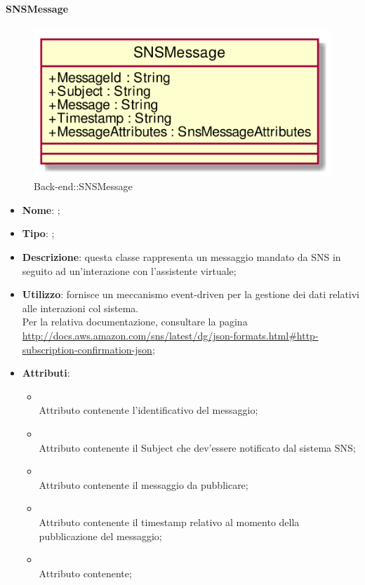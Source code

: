 \hypertarget{SNSMessage_label}{\paragraph{SNSMessage}}
\begin{figure}[h]
	\centering
	\includegraphics[width=\textwidth,height=\textheight,keepaspectratio]{images/ClassSNSMessage.png}
	\caption{Back-end::SNSMessage}
\end{figure}
\begin{itemize}
	\item \textbf{Nome}: ;
	\item \textbf{Tipo}: ;
	\item \textbf{Descrizione}: questa classe rappresenta un messaggio mandato da SNS in seguito ad un'interazione con l'assistente virtuale;
	\item \textbf{Utilizzo}: fornisce un meccanismo event-driven per la gestione dei dati relativi alle interazioni col sistema.\\
Per la relativa documentazione, consultare la pagina \url{http://docs.aws.amazon.com/sns/latest/dg/json-formats.html#http-subscription-confirmation-json};
	\item \textbf{Attributi}:
	\begin{itemize}
		\item[]  \\
		Attributo contenente l'identificativo del messaggio;
		\item[]  \\
		Attributo contenente il Subject che dev'essere notificato dal sistema SNS;
		\item[]  \\
		Attributo contenente il messaggio da pubblicare;
		\item[]  \\
		Attributo contenente il timestamp relativo al momento della pubblicazione del messaggio;
		\item[]  \\
		Attributo contenente;
	\end{itemize}
\end{itemize}
\FloatBarrier

